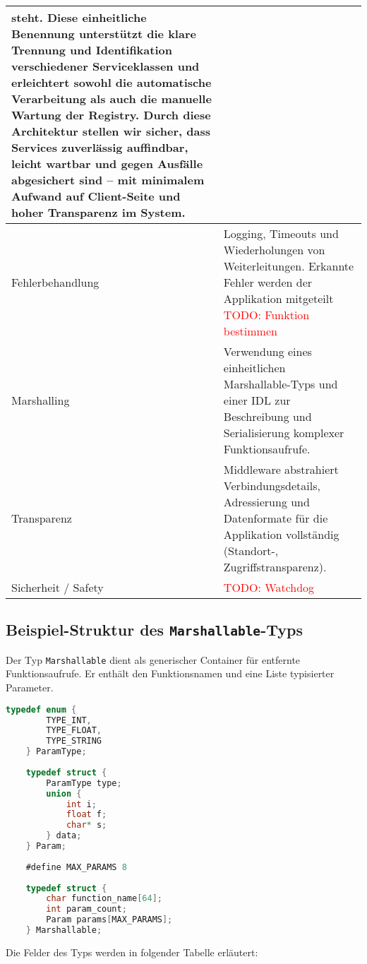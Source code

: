 \begin{longtable}{|>{\raggedright\arraybackslash}p{4cm}|>{\raggedright\arraybackslash}p{10cm}|}
	steht. Diese einheitliche Benennung unterstützt die klare Trennung und Identifikation verschiedener Serviceklassen und erleichtert sowohl die automatische Verarbeitung als auch die manuelle Wartung der Registry.
	Durch diese Architektur stellen wir sicher, dass Services zuverlässig auffindbar, leicht wartbar und gegen Ausfälle abgesichert sind – mit minimalem Aufwand auf Client-Seite und hoher Transparenz im System.
	\\
	\hline
	Fehlerbehandlung
	& Logging, Timeouts und Wiederholungen von Weiterleitungen. Erkannte Fehler werden der Applikation mitgeteilt \textcolor{red}{TODO: Funktion bestimmen}
	\\
	\hline
	Marshalling
	& Verwendung eines einheitlichen Marshallable-Typs und einer IDL zur Beschreibung und Serialisierung komplexer Funktionsaufrufe.
	\\
	\hline
	Transparenz
	& Middleware abstrahiert Verbindungsdetails, Adressierung und Datenformate für die Applikation vollständig (Standort-, Zugriffstransparenz).
	\\
	\hline
	Sicherheit / Safety
	& \textcolor{red}{TODO: Watchdog }
	\\
	\hline
	
\end{longtable}

\subsection*{Beispiel-Struktur des \texttt{Marshallable}-Typs}

Der Typ \texttt{Marshallable} dient als generischer Container für entfernte Funktionsaufrufe. Er enthält den Funktionsnamen und eine Liste typisierter Parameter.

\begin{lstlisting}[language=C, caption={Definition des \texttt{Marshallable}-Typs}]
	typedef enum {
		TYPE_INT,
		TYPE_FLOAT,
		TYPE_STRING
	} ParamType;
	
	typedef struct {
		ParamType type;
		union {
			int i;
			float f;
			char* s;
		} data;
	} Param;
	
	#define MAX_PARAMS 8
	
	typedef struct {
		char function_name[64];
		int param_count;
		Param params[MAX_PARAMS];
	} Marshallable;
\end{lstlisting}

\noindent Die Felder des Typs werden in folgender Tabelle erläutert:

